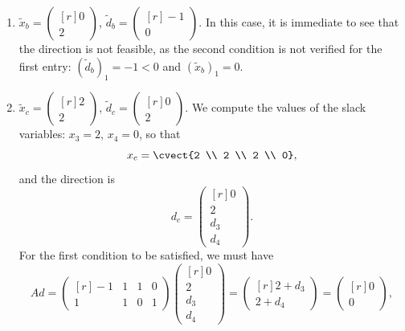 \begin{enumerate}
%
%
        \item $\tilde{x}_b = \begin{pmatrix*}[r] 0 \\ 2 \end{pmatrix*}$, $\tilde{d}_b = \begin{pmatrix*}[r] -1 \\ 0 \end{pmatrix*}.$ \vspace{0.5em} \newline
        In this case, it is immediate to see that the direction is not
        feasible, as the second condition is not verified for the
        first entry: $(\tilde{d}_b)_1 = -1 < 0$ and $(\tilde{x}_b)_1 = 0$.
        \vspace{1em}
%
%
        \item $\tilde{x}_c = \begin{pmatrix*}[r] 2 \\ 2 \end{pmatrix*}$, $\tilde{d}_c = \begin{pmatrix*}[r] 0 \\ 2 \end{pmatrix*}.$ \vspace{0.5em} \newline
        We compute the values of the slack variables: $x_3 = 2$, $x_4
        = 0$, so that
        \[
   {x}_c= \cvect{2 \\ 2 \\ 2 \\ 0}, 
   \]
   and the direction is
   \[
{d}_c = \begin{pmatrix*}[r] 0 \\ 2 \\ d_3 \\ d_4 \end{pmatrix*}.
   \]
   For the first condition to be satisfied, we must have
        \begin{equation*}
        Ad = \begin{pmatrix*}[r] -1 & 1 & 1 & 0 \\ 1 & 1 & 0 & 1 \end{pmatrix*} \begin{pmatrix*}[r] 0 \\ 2 \\ d_3 \\ d_4 \end{pmatrix*} = \begin{pmatrix*}[r] 2 + d_3 \\ 2 + d_4 \end{pmatrix*} = \begin{pmatrix*}[r] 0 \\ 0 \end{pmatrix*},

\end{equation*}
\end{enumerate}
